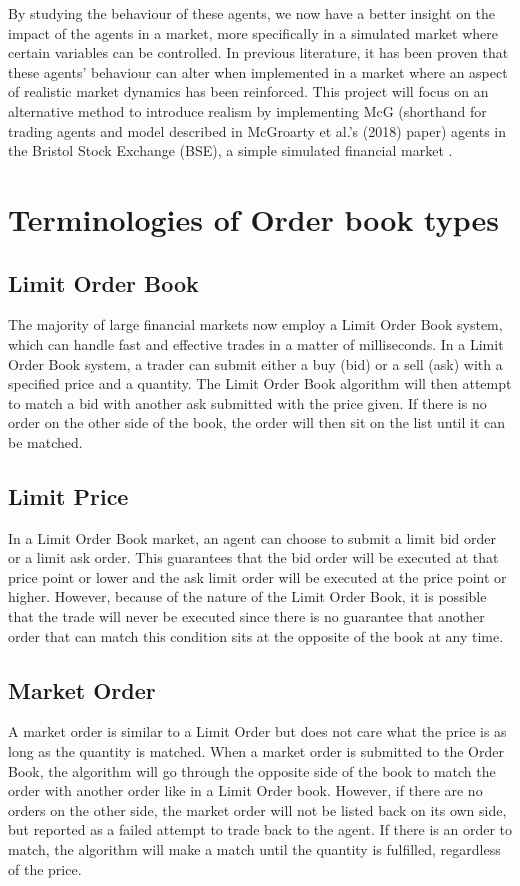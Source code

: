 By studying the behaviour of these agents, we now have a better insight on the impact of the agents in a market, more specifically in a simulated market where certain variables can be controlled. In previous literature, it has been proven that these agents' behaviour can alter when implemented in a market where an aspect of realistic market dynamics has been reinforced. This project will focus on an alternative method to introduce realism by implementing McG (shorthand for trading agents and model described in McGroarty et al.'s (2018) paper) \cite{McGroarty} agents in the Bristol Stock Exchange (BSE), a simple simulated financial market \cite{BSE_code}. 

\section{Terminologies of Order book types}
\subsection{Limit Order Book}
The majority of large financial markets now employ a Limit Order Book system, which can handle fast and effective trades in a matter of milliseconds. In a Limit Order Book system, a trader can submit either a buy (bid) or a sell (ask) with a specified price and a quantity. The Limit Order Book algorithm will then attempt to match a bid with another ask submitted with the price given. If there is no order on the other side of the book, the order will then sit on the list until it can be matched. 

\subsection{Limit Price}
In a Limit Order Book market, an agent can choose to submit a limit bid order or a limit ask order. This guarantees that the bid order will be executed at that price point or lower and the ask limit order will be executed at the price point or higher. However, because of the nature of the Limit Order Book, it is possible that the trade will never be executed since there is no guarantee that another order that can match this condition sits at the opposite of the book at any time. 

\subsection{Market Order}
A market order is similar to a Limit Order but does not care what the price is as long as the quantity is matched. When a market order is submitted to the Order Book, the algorithm will go through the opposite side of the book to match the order with another order like in a Limit Order book. However, if there are no orders on the other side, the market order will not be listed back on its own side, but reported as a failed attempt to trade back to the agent. If there is an order to match, the algorithm will make a match until the quantity is fulfilled, regardless of the price. 

